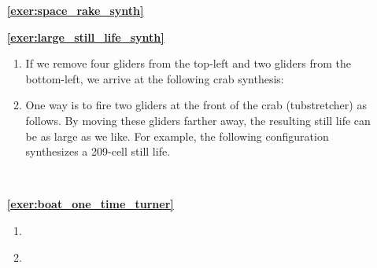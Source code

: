 \begin{multicols}{2}
\begin{itemize}[leftmargin=0em]
\begin{enumerate}[leftmargin=1.5em,label=\bf\color{ocre}(\alph*)]
		\item {} \\
	\end{enumerate}

	
	\item[\bf\color{ocre}\sffamily\ref{exer:space_rake_synth}]  \\
	
	
	\item[\bf\color{ocre}\sffamily\ref{exer:large_still_life_synth}]
	\begin{enumerate}[leftmargin=1.5em,label=(\alph*),series=solu_one_time]
		\item If we remove four gliders from the top-left and two gliders from the bottom-left, we arrive at the following crab synthesis:
		\begin{center}
		\end{center}

		\item One way is to fire two gliders at the front of the crab (tubstretcher) as follows. By moving these gliders farther away, the resulting still life can be as large as we like. For example, the following configuration synthesizes a 209-cell still life.
		\begin{center}
			 \\
		\end{center}
	\end{enumerate}
	
	
	\item[\bf\color{ocre}\sffamily\ref{exer:boat_one_time_turner}]
	\begin{enumerate}[leftmargin=1.5em,label=(\alph*),series=solu_one_time]
		\item {}
			
		\item {} \\


\end{enumerate}
\end{itemize}
\end{multicols}
